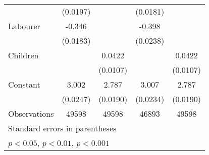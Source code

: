 {\begin{tabular}{l*{4}{c}}
                    &    (0.0197)         &                     &    (0.0181)         &                     \\
[1em]
Labourer            &      -0.346\sym{***}&                     &      -0.398\sym{***}&                     \\
                    &    (0.0183)         &                     &    (0.0238)         &                     \\
[1em]
Children            &                     &      0.0422\sym{***}&                     &      0.0422\sym{***}\\
                    &                     &    (0.0107)         &                     &    (0.0107)         \\
[1em]
Constant            &       3.002\sym{***}&       2.787\sym{***}&       3.007\sym{***}&       2.787\sym{***}\\
                    &    (0.0247)         &    (0.0190)         &    (0.0234)         &    (0.0190)         \\
\hline
Observations        &       49598         &       49598         &       46893         &       49598         \\
\hline\hline
\multicolumn{5}{l}{\footnotesize Standard errors in parentheses}\\
\multicolumn{5}{l}{\footnotesize \sym{*} \(p<0.05\), \sym{**} \(p<0.01\), \sym{***} \(p<0.001\)}\\
\end{tabular}
}
